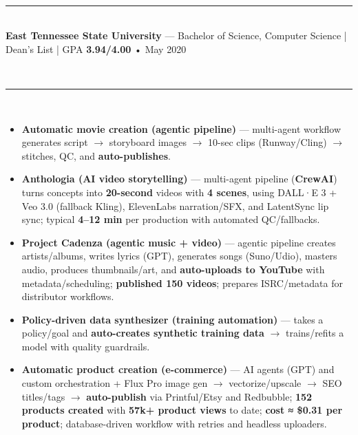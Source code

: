 \documentclass[11pt,a4paper]{article}
\newcommand{\resumesection}[1]{
    \vspace{3pt}                                    %
    \noindent{\fontsize{13}{15}\selectfont\textbf{#1}}\\[-8pt]                    %
    \noindent\textcolor{gray}{\rule{\textwidth}{2pt}}\\[-10pt]  %
}
\newcommand{\regbullet}[1]{
    \item {\fontsize{10}{12}\selectfont #1}
}
\begin{document}
\resumesection{EDUCATION}

\noindent\textbf{East Tennessee State University} — Bachelor of Science, Computer Science | Dean's List | GPA \textbf{3.94/4.00} • May 2020\\


\resumesection{SELECTED PROJECTS}

\begin{itemize}[leftmargin=18pt,itemsep=1pt,topsep=0pt]
\regbullet{\textbf{Automatic movie creation (agentic pipeline)} — multi-agent workflow generates script $\rightarrow$ storyboard images $\rightarrow$ 10-sec clips (Runway/Cling) $\rightarrow$ stitches, QC, and \textbf{auto-publishes}.}

\regbullet{\textbf{Anthologia (AI video storytelling)} — multi-agent pipeline (\textbf{CrewAI}) turns concepts into \textbf{20-second} videos with \textbf{4 scenes}, using DALL·E 3 + Veo 3.0 (fallback Kling), ElevenLabs narration/SFX, and LatentSync lip sync; typical \textbf{4--12 min} per production with automated QC/fallbacks.}

\regbullet{\textbf{Project Cadenza (agentic music + video)} — agentic pipeline creates artists/albums, writes lyrics (GPT), generates songs (Suno/Udio), masters audio, produces thumbnails/art, and \textbf{auto-uploads to YouTube} with metadata/scheduling; \textbf{published 150 videos}; prepares ISRC/metadata for distributor workflows.}

\regbullet{\textbf{Policy-driven data synthesizer (training automation)} — takes a policy/goal and \textbf{auto-creates synthetic training data} $\rightarrow$ trains/refits a model with quality guardrails.}

\regbullet{\textbf{Automatic product creation (e-commerce)} — AI agents (GPT) and custom orchestration + Flux Pro image gen $\rightarrow$ vectorize/upscale $\rightarrow$ SEO titles/tags $\rightarrow$ \textbf{auto-publish} via Printful/Etsy and Redbubble; \textbf{152 products created} with \textbf{57k+ product views} to date; \textbf{cost ≈ \$0.31 per product}; database-driven workflow with retries and headless uploaders.}


\end{itemize}
\end{document}
